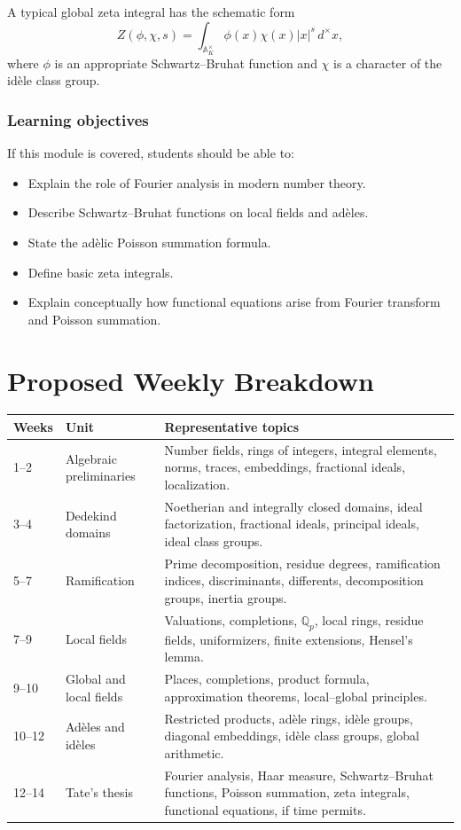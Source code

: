 \documentclass[11pt]{article}
\begin{document}
A typical global zeta integral has the schematic form
\[
    Z(\phi,\chi,s)
    =
    \int_{\mathbb{A}_K^\times}
    \phi(x)\chi(x)|x|^s\,d^\times x,
\]
where \(\phi\) is an appropriate Schwartz--Bruhat function and \(\chi\) is
a character of the idèle class group.

\subsubsection*{Learning objectives}

If this module is covered, students should be able to:

\begin{itemize}
    \item Explain the role of Fourier analysis in modern number theory.
    \item Describe Schwartz--Bruhat functions on local fields and adèles.
    \item State the adèlic Poisson summation formula.
    \item Define basic zeta integrals.
    \item Explain conceptually how functional equations arise from Fourier
          transform and Poisson summation.
\end{itemize}

\section{Proposed Weekly Breakdown}

\renewcommand{\arraystretch}{1.25}

\begin{longtable}{p{} p{} p{}}
\toprule
\textbf{Weeks} & \textbf{Unit} & \textbf{Representative topics} \\
\midrule
1--2 &
Algebraic preliminaries &
Number fields, rings of integers, integral elements, norms, traces,
embeddings, fractional ideals, localization. \\
\midrule
3--4 &
Dedekind domains &
Noetherian and integrally closed domains, ideal factorization, fractional
ideals, principal ideals, ideal class groups. \\
\midrule
5--7 &
Ramification &
Prime decomposition, residue degrees, ramification indices, discriminants,
differents, decomposition groups, inertia groups. \\
\midrule
7--9 &
Local fields &
Valuations, completions, \(\mathbb{Q}_p\), local rings, residue fields,
uniformizers, finite extensions, Hensel's lemma. \\
\midrule
9--10 &
Global and local fields &
Places, completions, product formula, approximation theorems, local--global
principles. \\
\midrule
10--12 &
Adèles and idèles &
Restricted products, adèle rings, idèle groups, diagonal embeddings,
idèle class groups, global arithmetic. \\
\midrule
12--14 &
Tate's thesis &
Fourier analysis, Haar measure, Schwartz--Bruhat functions, Poisson
summation, zeta integrals, functional equations, if time permits. \\
\bottomrule
\end{longtable}
\end{document}
